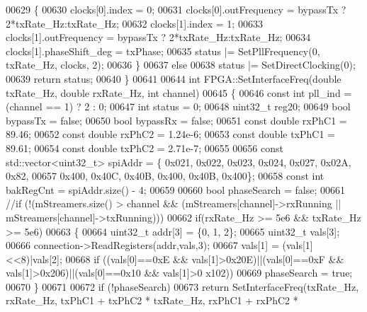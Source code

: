 \begin{DoxyCode}
{{{{{00629     \{
00630         clocks[0].index = 0;
00631         clocks[0].outFrequency = bypassTx ? 2*txRate\_Hz:txRate\_Hz;
00632         clocks[1].index = 1;
00633         clocks[1].outFrequency = bypassTx ? 2*txRate\_Hz:txRate\_Hz;
00634         clocks[1].phaseShift_deg = txPhase;
00635         status |= SetPllFrequency(0, txRate\_Hz, clocks, 2);
00636     \}
00637     \textcolor{keywordflow}{else}
00638         status |= SetDirectClocking(0);
00639     \textcolor{keywordflow}{return} status;
00640 \}
00641 
00644 \textcolor{keywordtype}{int} FPGA::SetInterfaceFreq(\textcolor{keywordtype}{double} txRate\_Hz, \textcolor{keywordtype}{double} rxRate\_Hz, \textcolor{keywordtype}{int} channel)
00645 \{
00646     \textcolor{keyword}{const} \textcolor{keywordtype}{int} pll\_ind = (channel == 1) ? 2 : 0;
00647     \textcolor{keywordtype}{int} status = 0;
00648     uint32\_t reg20;
00649     \textcolor{keywordtype}{bool} bypassTx = \textcolor{keyword}{false};
00650     \textcolor{keywordtype}{bool} bypassRx = \textcolor{keyword}{false};
00651     \textcolor{keyword}{const} \textcolor{keywordtype}{double} rxPhC1 =  89.46;
00652     \textcolor{keyword}{const} \textcolor{keywordtype}{double} rxPhC2 =  1.24e-6;
00653     \textcolor{keyword}{const} \textcolor{keywordtype}{double} txPhC1 =  89.61;
00654     \textcolor{keyword}{const} \textcolor{keywordtype}{double} txPhC2 =  2.71e-7;
00655 
00656     \textcolor{keyword}{const} std::vector<uint32\_t> spiAddr = \{ 0x021, 0x022, 0x023, 0x024, 0x027, 0x02A, 0x82,
00657                                             0x400, 0x40C, 0x40B, 0x400, 0x40B, 0x400\};
00658     \textcolor{keyword}{const} \textcolor{keywordtype}{int} bakRegCnt = spiAddr.size() - 4;
00659 
00660     \textcolor{keywordtype}{bool} phaseSearch = \textcolor{keyword}{false};
00661     \textcolor{comment}{//if (!(mStreamers.size() > channel && (mStreamers[channel]->rxRunning ||
       mStreamers[channel]->txRunning)))}
00662     \textcolor{keywordflow}{if}(rxRate\_Hz >= 5e6 && txRate\_Hz >= 5e6)
00663     \{
00664         uint32\_t addr[3] = \{0, 1, 2\};
00665         uint32\_t vals[3];
00666         connection->ReadRegisters(addr,vals,3);
00667         vals[1] = (vals[1]<<8)|vals[2];
00668         \textcolor{keywordflow}{if} ((vals[0]==0xE && vals[1]>0x20E)||(vals[0]==0xF && vals[1]>0x206)||(vals[0]==0x10 && vals[1]>0
      x102))
00669             phaseSearch = \textcolor{keyword}{true};
00670     \}
00671 
00672     \textcolor{keywordflow}{if} (!phaseSearch)
00673         \textcolor{keywordflow}{return} SetInterfaceFreq(txRate\_Hz, rxRate\_Hz, txPhC1 + txPhC2 * txRate\_Hz, rxPhC1 + rxPhC2 * 
}}}}}
\end{DoxyCode}
